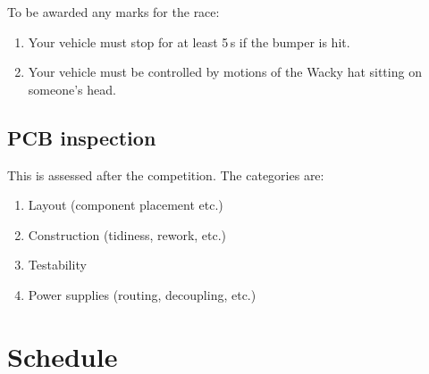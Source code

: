 \documentclass[11pt, a4paper]{article}
\begin{document}
To be awarded any marks for the race:
%
\begin{enumerate}
\item Your vehicle must stop for at least 5\,s if the bumper is hit.

\item Your vehicle must be controlled by motions of the Wacky hat
  sitting on someone's head.
\end{enumerate}


\subsection{PCB inspection}

This is assessed after the competition.  The categories are:
%
\begin{enumerate}
\item Layout (component placement etc.)
\item Construction (tidiness, rework, etc.)
\item Testability
\item Power supplies (routing, decoupling, etc.)
\end{enumerate}


\section{Schedule}
\end{document}
